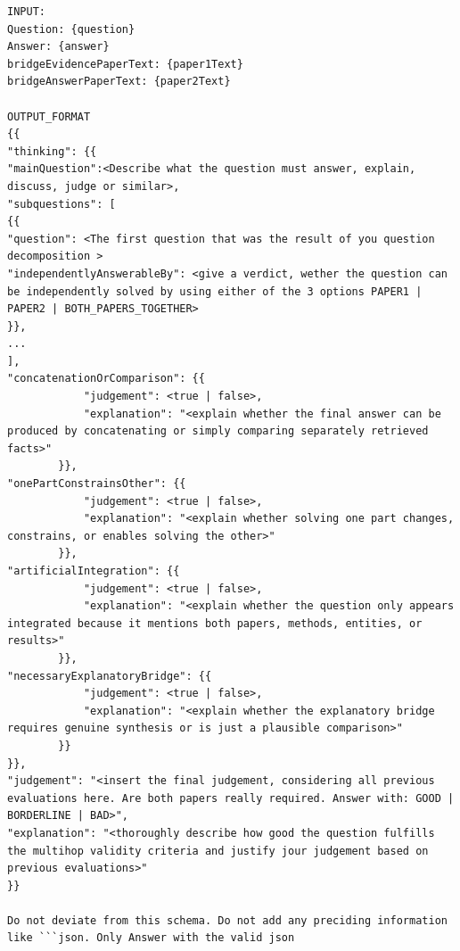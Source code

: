 \begin{lstlisting}[caption={Non-Decomposability Prompt}, label={lst:NonDecomposabilityPrompt}]
INPUT:
Question: {question}
Answer: {answer}
bridgeEvidencePaperText: {paper1Text}
bridgeAnswerPaperText: {paper2Text}

OUTPUT_FORMAT
{{
"thinking": {{
"mainQuestion":<Describe what the question must answer, explain, discuss, judge or similar>,
"subquestions": [
{{
"question": <The first question that was the result of you question decomposition >
"independentlyAnswerableBy": <give a verdict, wether the question can be independently solved by using either of the 3 options PAPER1 | PAPER2 | BOTH_PAPERS_TOGETHER>
}},
...
],
"concatenationOrComparison": {{
            "judgement": <true | false>,
            "explanation": "<explain whether the final answer can be produced by concatenating or simply comparing separately retrieved facts>"
        }},
"onePartConstrainsOther": {{
            "judgement": <true | false>,
            "explanation": "<explain whether solving one part changes, constrains, or enables solving the other>"
        }},
"artificialIntegration": {{
            "judgement": <true | false>,
            "explanation": "<explain whether the question only appears integrated because it mentions both papers, methods, entities, or results>"
        }},
"necessaryExplanatoryBridge": {{
            "judgement": <true | false>,
            "explanation": "<explain whether the explanatory bridge requires genuine synthesis or is just a plausible comparison>"
        }}
}},
"judgement": "<insert the final judgement, considering all previous evaluations here. Are both papers really required. Answer with: GOOD | BORDERLINE | BAD>",
"explanation": "<thoroughly describe how good the question fulfills the multihop validity criteria and justify jour judgement based on previous evaluations>"
}}

Do not deviate from this schema. Do not add any preciding information like ```json. Only Answer with the valid json

\end{lstlisting}


